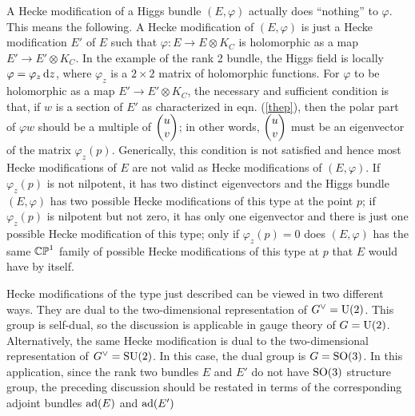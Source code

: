 \documentclass[11pt,a4paper]{article}
\begin{document}
A Hecke modification of a Higgs bundle $(E,\varphi)$ actually does ``nothing'' to $\varphi$.    This means the following.   A Hecke modification of $(E,\varphi)$
is just a Hecke modification $E'$ of $E$ such that $\varphi:E\to E\otimes K_C$ is holomorphic
as a map $E'\to E'\otimes K_C$.   In the example of the rank 2 bundle, the Higgs field is locally $\varphi=\varphi_z\,\mathrm d z$, where $\varphi_z$ is a $2\times 2$ matrix of
holomorphic functions. 
   For $\varphi$ to be holomorphic as a map $E'\to E'\otimes K_C$, the necessary and sufficient condition is that, if $w$ is a section of $E'$
as characterized in eqn. (\ref{thep}), then the polar part of $\varphi w$  should be a multiple of $\begin{pmatrix}u\cr v\end{pmatrix}$; in other
words, $\begin{pmatrix}u\cr v\end{pmatrix}$ must be an eigenvector of the matrix $\varphi_z(p)$.
Generically, this condition is not satisfied and hence most Hecke modifications of $E$ are not valid as Hecke modifications of $(E,\varphi)$.   
If $\varphi_z(p)$ is not nilpotent,  it has  two distinct eigenvectors and 
the Higgs bundle $(E,\varphi)$ has two 
 possible Hecke modifications of this type  at the point $p$;
if $\varphi_z(p)$ is nilpotent but not zero, it has only one eigenvector and there is just one possible Hecke modification of this type; only if $\varphi_z(p)=0$ 
does  $(E,\varphi)$ has the same  ${\mathbb{CP}}^1$ family of possible Hecke modifications of this type at $p$ that $E$ would have by itself.

Hecke modifications of the type just described can be viewed in two different ways.  
They are  dual to the two-dimensional representation of $G^\vee={\mathrm U}(2)$.   This group is self-dual, so the  discussion
is applicable in gauge theory of $G={\mathrm U}(2)$.    Alternatively, the same Hecke modification is dual to the two-dimensional representation of $G^\vee={\mathrm{SU}}(2)$.
In this case, the dual group is $G={\mathrm{SO}}(3)$.   In this application, since the rank two bundles $E$ and $E'$  do not have ${\mathrm{SO}}(3)$ structure group, the
preceding discussion should be restated in terms of the corresponding adjoint bundles ${\mathrm{ad}}(E)$ and ${\mathrm{ad}}(E')$
\end{document}
